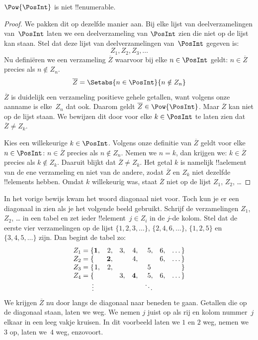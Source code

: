 \documentclass[../../../include/open-logic-section]{subfiles}
\begin{document}
\begin{thm}
$\Pow{\PosInt}$ is niet !!{enumerable}.
\end{thm}

\begin{proof}
We pakken dit op dezelfde manier aan. Bij elke lijst van
deelverzamelingen van~$\PosInt$ laten we een deelverzameling van
$\PosInt$ zien die niet op de lijst kan staan. Stel dat deze lijst van
deelverzamelingen van~$\PosInt$ gegeven is:
\[
Z_{1}, Z_{2}, Z_{3}, \dots
\]
Nu definiëren we een verzameling $\overline{Z}$ waarvoor bij elke
$n \in \PosInt$ geldt: $n \in \overline{Z}$ precies als $n \notin
Z_{n}$.
\[
\overline{Z} = \Setabs{n \in \PosInt}{n \notin Z_n}
\]
$\overline{Z}$ is duidelijk een verzameling positieve gehele getallen,
want volgens onze aanname is elke~$Z_n$ dat ook. Daarom geldt
$\overline{Z} \in \Pow{\PosInt}$. Maar $\overline{Z}$ kan niet op de
lijst staan. We bewijzen dit door voor elke $k \in \PosInt$ te laten
zien dat $\overline{Z} \neq Z_k$.

Kies een willekeurige $k \in \PosInt$. Volgens onze definitie van
$\overline{Z}$ geldt voor elke $n \in \PosInt$: $n \in \overline{Z}$
precies als $n \notin Z_n$. Nemen we $n=k$, dan krijgen we: $k \in
\overline{Z}$ precies als $k \notin Z_k$. Daaruit blijkt dat
$\overline{Z} \neq Z_k$. Het getal $k$ is namelijk !!a{element} van de
ene verzameling en niet van de andere, zodat $\overline{Z}$ en $Z_k$
niet dezelfde !!{element}s hebben. Omdat $k$ willekeurig was, staat
$\overline{Z}$ niet op de lijst $Z_1$, $Z_2$, \dots
\end{proof}

\begin{explain}
In het vorige bewijs kwam het woord diagonaal niet voor. Toch kun je er
een diagonaal in zien als je het volgende beeld gebruikt. Schrijf de
verzamelingen $Z_1$, $Z_2$, \dots{} in een tabel en zet ieder
!!{element}~$j \in Z_i$ in de $j$-de kolom. Stel dat de eerste vier
verzamelingen op de lijst $\{1,2,3,\dots\}$, $\{2, 4, 6, \dots\}$,
$\{1,2,5\}$ en $\{3,4,5,\dots\}$ zijn. Dan begint de tabel zo:
\[
\begin{array}{r@{}rrrrrrr}
  Z_1 = \{ & \mathbf{1}, & 2, & 3, & 4, & 5, & 6, & \dots\}\\
  Z_2 = \{ &  & \mathbf{2}, &  & 4, &  & 6, & \dots\}\\
  Z_3 = \{ & 1, & 2, &  &  & 5\phantom{,} &  & \}\\
  Z_4 = \{ &  &  & 3, & \mathbf{4}, & 5, & 6, & \dots\}\\
  \vdots & & & & & \ddots
\end{array}
\]
We krijgen $\overline{Z}$ nu door langs de diagonaal naar beneden te
gaan. Getallen die op de diagonaal staan, laten we weg. We nemen $j$
juist op als rij en kolom nummer~$j$ elkaar in een leeg vakje kruisen.
In dit voorbeeld laten we $1$ en $2$ weg, nemen we~$3$ op, laten we~$4$
weg, enzovoort.
\end{explain}
\end{document}
